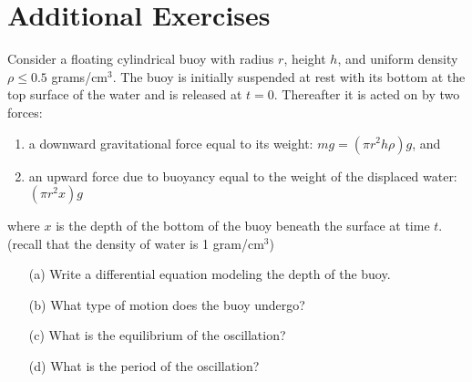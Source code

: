 \section{Additional Exercises}


\begin{problem}
\item Consider a floating cylindrical buoy with radius $r$, height $h$, and uniform
    density $\rho \le 0.5$ grams/cm$^3$.  The buoy is initially suspended at rest with
    its bottom at the top surface of the water and is released at $t=0$.  Thereafter
    it is acted on by two forces: 
    \begin{enumerate}
        \item a downward gravitational force equal to its weight: $mg = \left( \pi r^2 h
            \rho \right) g$, and
        \item an upward force due to buoyancy equal to the weight of the displaced water:
            $\left( \pi r^2 x\right) g$
    \end{enumerate}
    where $x$ is the depth of the bottom of the buoy beneath the surface at time $t$.
    (recall that the density of water is 1 gram/cm$^3$)
    \begin{itemize}
        \item[(a)] Write a differential equation modeling the depth of the buoy.
        \item[(b)] What type of motion does the buoy undergo?
        \item[(c)] What is the equilibrium of the oscillation?
        \item[(d)] What is the period of the oscillation?
    \end{itemize}
\end{problem}


